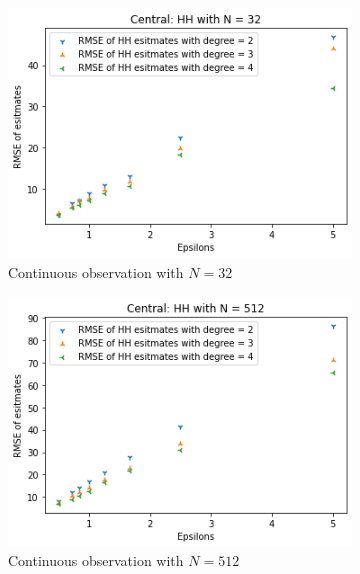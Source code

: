 \documentclass[11pt]{article}
\theoremstyle{definition}
\begin{document}
\begin{figure}[H]
     \centering
     \begin{subfigure}[b]{0.3\textwidth}
         \centering
         \includegraphics[width=\textwidth]{figures/hh_cen_epsi/hh_1_N=32.png}
         \caption{Continuous observation with $N=32$}
         \label{fig:a1}
     \end{subfigure}
     \hfill
     \begin{subfigure}[b]{0.3\textwidth}
         \centering
         \includegraphics[width=\textwidth]{figures/hh_cen_epsi/hh_1_N=512.png}
         \caption{Continuous observation with $N=512$}
         \label{fig:b2}
     \end{subfigure}
     \hfill
     \begin{subfigure}[b]{0.3\textwidth}

\end{subfigure}
\end{figure}
\end{document}
